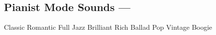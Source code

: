 \subsection{Pianist Mode Sounds --- \UiKey{\I}\UiKey{\SND}}
Classic
Romantic
Full
Jazz
Brilliant
Rich
Ballad
Pop
Vintage
Boogie
